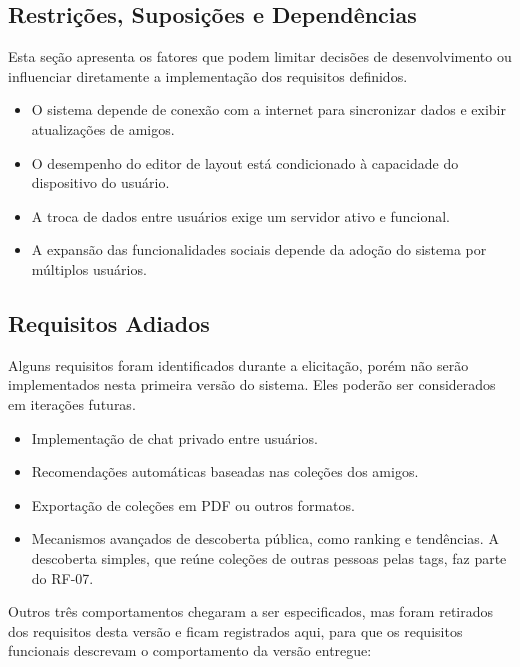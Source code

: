 \subsection{Restrições, Suposições e Dependências}
Esta seção apresenta os fatores que podem limitar decisões de desenvolvimento ou influenciar diretamente a implementação dos requisitos definidos.

\begin{itemize}
\item O sistema depende de conexão com a internet para sincronizar dados e exibir atualizações de amigos.
\item O desempenho do editor de layout está condicionado à capacidade do dispositivo do usuário.
\item A troca de dados entre usuários exige um servidor ativo e funcional.
\item A expansão das funcionalidades sociais depende da adoção do sistema por múltiplos usuários.
\end{itemize}


\subsection{Requisitos Adiados}
\label{subsec:requisitos_adiados}
Alguns requisitos foram identificados durante a elicitação, porém não serão implementados nesta primeira versão do sistema. Eles poderão ser considerados em iterações futuras.

\begin{itemize}
\item Implementação de chat privado entre usuários.
\item Recomendações automáticas baseadas nas coleções dos amigos.
\item Exportação de coleções em PDF ou outros formatos.
\item Mecanismos avançados de descoberta pública, como ranking e tendências. A descoberta simples, que reúne coleções de outras pessoas pelas tags, faz parte do RF-07.
\end{itemize}

Outros três comportamentos chegaram a ser especificados, mas foram retirados dos requisitos
desta versão e ficam registrados aqui, para que os requisitos funcionais descrevam o comportamento
da versão entregue:

